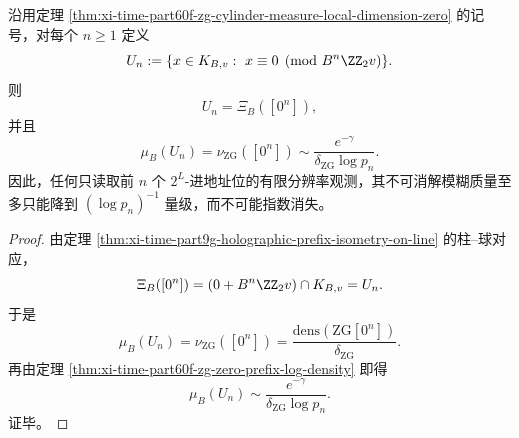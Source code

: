 \begin{corollary}[有限地址分辨率的不可消解模糊质量]\label{cor:xi-time-part60f-address-resolution-logarithmic-ambiguity-mass}
沿用定理 \ref{thm:xi-time-part60f-zg-cylinder-measure-local-dimension-zero} 的记号，对每个 \(n\ge 1\) 定义
\[
U_n
:=
\{x\in K_{B,v}:\ x\equiv 0\pmod{B^n\ZZ_2v}\}.
\]
则
\[
U_n=\Xi_B([0^n]),
\]
并且
\[
\mu_B(U_n)
=
\nu_{\mathrm{ZG}}([0^n])
\sim
\frac{e^{-\gamma}}{\delta_{\mathrm{ZG}}\log p_n}.
\]
因此，任何只读取前 \(n\) 个 \(2^L\)-进地址位的有限分辨率观测，其不可消解模糊质量至多只能降到 \((\log p_n)^{-1}\) 量级，而不可能指数消失。
\end{corollary}
\begin{proof}
由定理 \ref{thm:xi-time-part9g-holographic-prefix-isometry-on-line} 的柱--球对应，
\[
\Xi_B([0^n])=(0+B^n\ZZ_2v)\cap K_{B,v}=U_n.
\]
于是
\[
\mu_B(U_n)=\nu_{\mathrm{ZG}}([0^n])
=
\frac{\mathrm{dens}(\mathrm{ZG}[0^n])}{\delta_{\mathrm{ZG}}}.
\]
再由定理 \ref{thm:xi-time-part60f-zg-zero-prefix-log-density} 即得
\[
\mu_B(U_n)\sim \frac{e^{-\gamma}}{\delta_{\mathrm{ZG}}\log p_n}.
\]
证毕。
\end{proof}

